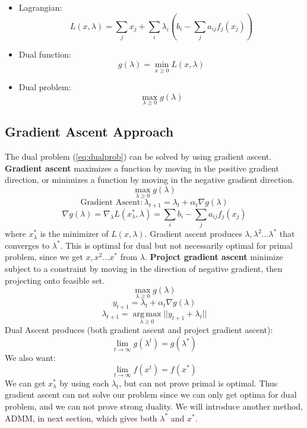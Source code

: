 \documentclass{article}
\DeclareMathOperator*{\argmax}{arg\,max}
\begin{document}
\begin{itemize}
    \item Lagrangian: 
    \begin{equation}
        L(x,\lambda) = \sum\limits_j x_j + \sum\limits_i \lambda_i(b_i - \sum\limits_j a_{ij}f_j(x_j))
    \end{equation}
    \item Dual function:
    \begin{equation}
        g(\lambda) = \min\limits_{x \ge 0} L(x, \lambda)
    \end{equation}
    \item Dual problem:
    \begin{equation}\label{eq:dualprob}
        \max\limits_{\lambda \ge 0} g(\lambda)
    \end{equation}
\end{itemize}
\subsection{Gradient Ascent Approach}
The dual problem (\ref{eq:dualprob}) can be solved by using gradient ascent. \textbf{Gradient ascent} maximizes a function by moving in the positive gradient direction, or minimizes a function by moving in the negative gradient direction. 
$$ \max\limits_{\lambda \ge 0} g(\lambda)$$
$$\text{Gradient Ascent}: \lambda_{t+1} = \lambda_{t}+\alpha_{t}\nabla g(\lambda)$$
$$\nabla g(\lambda)=\nabla_{\lambda}L(x_{\lambda}^*, \lambda)=\sum\limits_{i} b_{i}-\sum\limits_{j} a_{ij} f_{j}(x_j)$$
where $x_\lambda^*$ is the minimizer of $L(x,\lambda)$.\newline
Gradient ascent produces $\lambda, \lambda^2\ldots \lambda^*$ that converges to $\lambda^*$. This is optimal for dual but not necessarily optimal for primal problem, since we get $x, x^2 \ldots x^*$ from $\lambda$.\newline\newline
\textbf{Project gradient ascent} minimize subject to a constraint by moving in the direction of negative gradient, then projecting onto feasible set. 
$$\max\limits_{\lambda \ge 0}g(\lambda)$$
$$y_{t+1} = \lambda_t+\alpha_t\nabla g(\lambda)$$
$$\lambda_{t+1}= \argmax\limits_{\lambda \ge 0}||y_{t+1}+\lambda_t||$$
Dual Ascent produces (both gradient ascent and project gradient ascent):
$$\lim_{t\to\infty}g(\lambda^{t})=g(\lambda^*)$$
We also want: 
$$\lim_{t\to\infty}f(x^{t})=f(x^*)$$
We can get $x_{\lambda}^*$ by using each $\lambda_t$, but can not prove primal is optimal. \newline
Thus gradient ascent can not solve our problem since we can only get optima for dual problem, and we can not prove strong duality. We will introduce another method, ADMM, in next section, which gives both $\lambda^*$ and $x^*$. 
\end{document}
